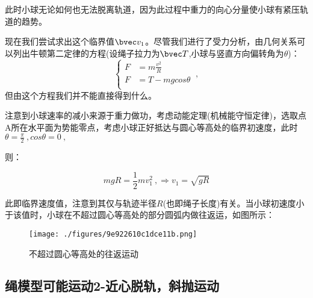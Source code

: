 此时小球无论如何也无法脱离轨道，因为此过程中重力的向心分量使小球有紧压轨道的趋势。

现在我们尝试求出这个临界值$\bvec v_1$。尽管我们进行了受力分析，由几何关系可以列出牛顿第二定律的方程(设绳子拉力为$\bvec T$,小球与竖直方向偏转角为$\theta$)：
$$
\left \{
\begin{aligned}
F&=m\frac{v^2}{R}\\
F&=T-mg cos \theta \\
\end{aligned}
\right.
~,
$$
但由这个方程我们并不能直接得到什么。

注意到小球速率的减小来源于重力做功，考虑动能定理(机械能守恒定律)，选取点A所在水平面为势能零点，考虑小球正好抵达与圆心等高处的临界初速度，此时
$\theta=\frac{\pi }{2}~, cos \theta=0~,$

则：

\begin{equation}
mgR = \frac12 mv_1^2 ~,
\Rightarrow 
v_1=\sqrt{gR}
\end{equation}

此即临界速度值，注意到其仅与轨迹半径$R$(也即绳子长度)有关。当小球初速度小于该值时，小球在不超过圆心等高处的部分圆弧内做往返运，如图所示：
\begin{figure}[ht]
\centering
\texttt{[image: ./figures/9e922610c1dce11b.png]}
\caption{不超过圆心等高处的往返运动} \label{fig_CirVer_2}
\end{figure}




\subsection{绳模型可能运动2-近心脱轨，斜抛运动}